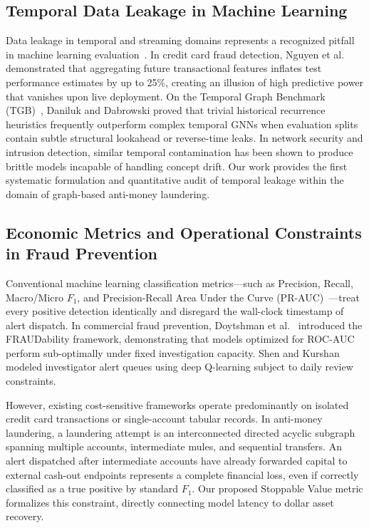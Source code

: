 \documentclass[pdflatex,sn-mathphys,Numbered]{sn-jnl}
\theoremstyle{thmstyleone}
\theoremstyle{thmstyletwo}
\theoremstyle{thmstylethree}
\begin{document}
\subsection{Temporal Data Leakage in Machine Learning}
Data leakage in temporal and streaming domains represents a recognized pitfall in machine learning evaluation~\cite{kaufman2012leakage}. In credit card fraud detection, Nguyen et al.~\cite{nguyen2022future} demonstrated that aggregating future transactional features inflates test performance estimates by up to 25\%, creating an illusion of high predictive power that vanishes upon live deployment. On the Temporal Graph Benchmark (TGB)~\cite{daniluk2023global}, Daniluk and Dabrowski proved that trivial historical recurrence heuristics frequently outperform complex temporal GNNs when evaluation splits contain subtle structural lookahead or reverse-time leaks. In network security and intrusion detection, similar temporal contamination has been shown to produce brittle models incapable of handling concept drift. Our work provides the first systematic formulation and quantitative audit of temporal leakage within the domain of graph-based anti-money laundering.

\subsection{Economic Metrics and Operational Constraints in Fraud Prevention}
Conventional machine learning classification metrics---such as Precision, Recall, Macro/Micro $F_1$, and Precision-Recall Area Under the Curve (PR-AUC)~\cite{saito2015prroc,chicco2020mcc}---treat every positive detection identically and disregard the wall-clock timestamp of alert dispatch. In commercial fraud prevention, Doytshman et al.~\cite{doytshman2023fraudability} introduced the FRAUDability framework, demonstrating that models optimized for ROC-AUC perform sub-optimally under fixed investigation capacity. Shen and Kurshan~\cite{shen2020dqn} modeled investigator alert queues using deep Q-learning subject to daily review constraints. 

However, existing cost-sensitive frameworks operate predominantly on isolated credit card transactions or single-account tabular records. In anti-money laundering, a laundering attempt is an interconnected directed acyclic subgraph spanning multiple accounts, intermediate mules, and sequential transfers. An alert dispatched after intermediate accounts have already forwarded capital to external cash-out endpoints represents a complete financial loss, even if correctly classified as a true positive by standard $F_1$. Our proposed Stoppable Value metric formalizes this constraint, directly connecting model latency to dollar asset recovery.
\end{document}
